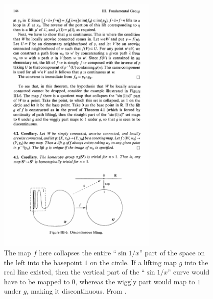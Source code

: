 \begin{figure}
    \centering
    \includegraphics[width=0.7\textwidth]{figures/discont_lift.pdf}
    \caption{The map $f$ here collapses the entire ``$\sin 1/x$'' part of the space on the left into the basepoint $1$ on the circle. If a lifting map $g$ into the real line existed, then the vertical part of the ``$\sin 1/x$'' curve would have to be mapped to $0$, whereas the wiggly part would map to $1$ under $g$, making it discontinuous. From \cite[Fig.~III-6]{Bredon}.}
    \label{fig:discont_lift}
\end{figure}

